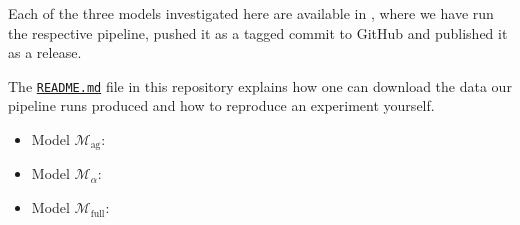 \begin{tcolorbox}[title=\faIcon{recycle} Reproducibility, parbox=false]
    Each of the three models investigated here are available in , where we have run the respective pipeline, pushed it as a tagged commit to GitHub and published it as a release.

    The \href{https://github.com/rmnldwg/lynference#readme}{ \texttt{README.md}} file in this repository explains how one can download the data our pipeline runs produced and how to reproduce an experiment yourself.

    \begin{itemize}
        \item Model $\mathcal{M}_\text{ag}$: 
        \item Model $\mathcal{M}_\alpha$: 
        \item Model $\mathcal{M}_\text{full}$: 
    \end{itemize}
\end{tcolorbox}
